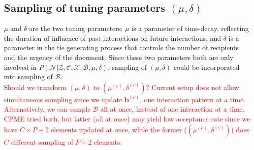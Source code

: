 \documentclass[a4paper]{article}
\begin{document}
\subsection{Sampling of tuning parameters $(\mu, \delta)$}
$\mu$ and $\delta$ are the two tuning parameters; $\mu$ is a parameter of time-decay, reflecting the duration of influence of past interactions on future interactions, and $\delta$ is a parameter in the tie generating process that controls the number of recipients and the urgency of the document. Since these two parameters both are only involved in $P(\mathcal{N}| \mathcal{Z}, \mathcal{C}, \mathcal{X}, \mathcal{B}, \mu, \delta)$, sampling of $(\mu, \delta)$ could be incorporated into sampling of $\mathcal{B}$.\\\newline
\textcolor{red}{Should we transform $(\mu, \delta)$ to $(\mu^{(c)}, \delta^{(c)})$? Current setup does not allow simultaneous sampling since we update $\boldsymbol{b}^{(c)}$, one interaction pattern at a time. Alternatively, we can sample $\mathcal{B}$ all at once, instead of one interaction at a time. CPME tried both, but latter (all at once) may yield low acceptance rate since we have $C\times P+2$ elements updated at once, while the former ($(\mu^{(c)}, \delta^{(c)})$) does $C$ different sampling of $P+2$ elements.}
\end{document}
